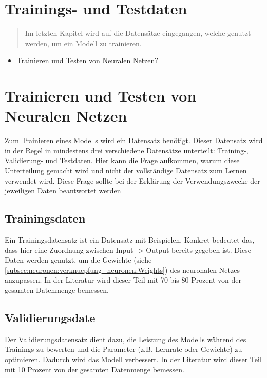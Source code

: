 \newpage
\thispagestyle{empty}
\section{Trainings- und Testdaten}\label{sec:training_testdaten}   
\begin{tcolorbox}[title={Inhalte von \textit{Trainings- und Testdaten}}]
  \begin{quotation}\noindent
    Im letzten Kapitel wird auf die Datensätze eingegangen, welche genutzt werden, um ein Modell zu trainieren.
  \end{quotation}
  \begin{itemize}
    \item Trainieren und Testen von Neuralen Netzen?


  \end{itemize}
\end{tcolorbox}

\section{Trainieren und Testen von Neuralen Netzen}\label{sec:trainingsdaten}   
Zum Trainieren eines Modells wird ein Datensatz benötigt. Dieser Datensatz wird in der Regel in mindestens drei verschiedene Datensätze unterteilt: Training-, Validierung- und Testdaten.
Hier kann die Frage aufkommen, warum diese Unterteilung gemacht wird und nicht der vollständige Datensatz zum Lernen verwendet wird. 
Diese Frage sollte bei der Erklärung der Verwendungszwecke der jeweiligen Daten beantwortet werden

\subsection{Trainingsdaten}
Ein Trainingsdatensatz ist ein Datensatz mit Beispielen. Konkret bedeutet das, dass hier eine Zuordnung zwischen Input -> Output bereits gegeben ist. 
Diese Daten werden genutzt, um die Gewichte (siehe \ref*{subsec:neuronen:verknuepfung_neuronen:Weights}) des neuronalen Netzes anzupassen.
In der Literatur wird dieser Teil mit 70 bis 80 Prozent von der gesamten Datenmenge bemessen.

\subsection{Validierungsdate}
Der Validierungsdatensatz dient dazu, die Leistung des Modells während des Trainings zu bewerten und die Parameter (z.B. Lernrate oder Gewichte) zu optimieren. 
Dadurch wird das Modell verbessert.
In der Literatur wird dieser Teil mit 10 Prozent von der gesamten Datenmenge bemessen.

